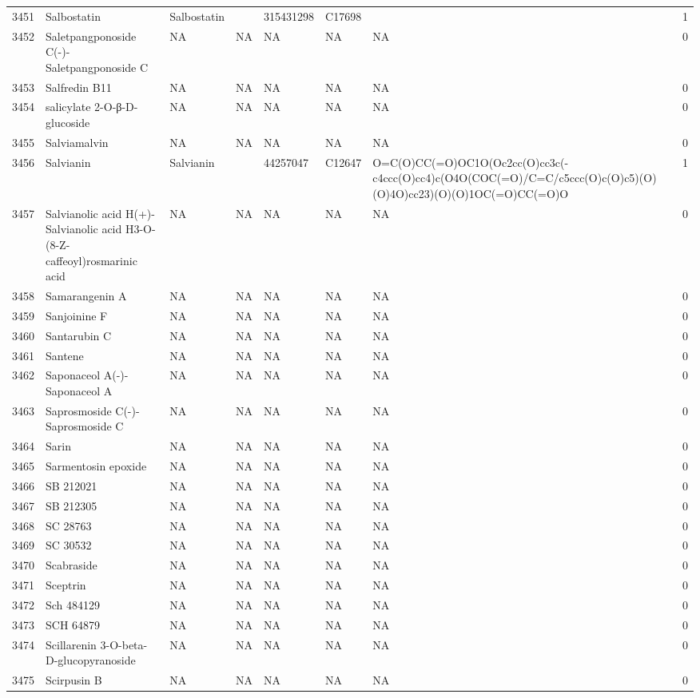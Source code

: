 \documentclass[a4paper]{article}
\begin{document}
\begin{longtable}{rlllllll}
  3451 & Salbostatin & Salbostatin &  & 315431298 & C17698 &  & 1 \\ 
  3452 & Saletpangponoside C(-)-Saletpangponoside C & NA & NA & NA & NA & NA & 0 \\ 
  3453 & Salfredin B11 & NA & NA & NA & NA & NA & 0 \\ 
  3454 & salicylate 2-O-β-D-glucoside & NA & NA & NA & NA & NA & 0 \\ 
  3455 & Salviamalvin & NA & NA & NA & NA & NA & 0 \\ 
  3456 & Salvianin & Salvianin &  & 44257047 & C12647 & O=C(O)CC(=O)OC1O(Oc2cc(O)cc3c(-c4ccc(O)cc4)c(O4O(COC(=O)/C=C/c5ccc(O)c(O)c5)(O)(O)4O)cc23)(O)(O)1OC(=O)CC(=O)O & 1 \\ 
  3457 & Salvianolic acid H(+)-Salvianolic acid H3-O-(8-Z-caffeoyl)rosmarinic acid & NA & NA & NA & NA & NA & 0 \\ 
  3458 & Samarangenin A & NA & NA & NA & NA & NA & 0 \\ 
  3459 & Sanjoinine F & NA & NA & NA & NA & NA & 0 \\ 
  3460 & Santarubin C & NA & NA & NA & NA & NA & 0 \\ 
  3461 & Santene & NA & NA & NA & NA & NA & 0 \\ 
  3462 & Saponaceol A(-)-Saponaceol A & NA & NA & NA & NA & NA & 0 \\ 
  3463 & Saprosmoside C(-)-Saprosmoside C & NA & NA & NA & NA & NA & 0 \\ 
  3464 & Sarin & NA & NA & NA & NA & NA & 0 \\ 
  3465 & Sarmentosin epoxide & NA & NA & NA & NA & NA & 0 \\ 
  3466 & SB 212021 & NA & NA & NA & NA & NA & 0 \\ 
  3467 & SB 212305 & NA & NA & NA & NA & NA & 0 \\ 
  3468 & SC 28763 & NA & NA & NA & NA & NA & 0 \\ 
  3469 & SC 30532 & NA & NA & NA & NA & NA & 0 \\ 
  3470 & Scabraside & NA & NA & NA & NA & NA & 0 \\ 
  3471 & Sceptrin & NA & NA & NA & NA & NA & 0 \\ 
  3472 & Sch 484129 & NA & NA & NA & NA & NA & 0 \\ 
  3473 & SCH 64879 & NA & NA & NA & NA & NA & 0 \\ 
  3474 & Scillarenin 3-O-beta-D-glucopyranoside & NA & NA & NA & NA & NA & 0 \\ 
  3475 & Scirpusin B & NA & NA & NA & NA & NA & 0 \\ 

\end{longtable}
\end{document}
